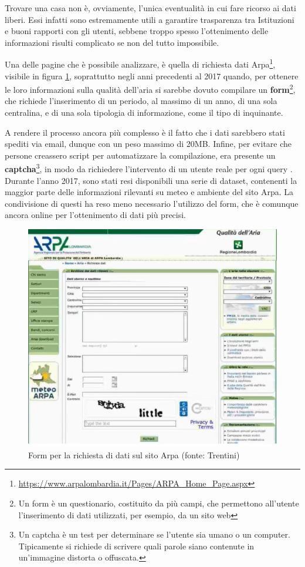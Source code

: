 \documentclass[a4paper,12pt]{report}
\newcommand{\skipline}{\vspace{0.2in}}
\begin{document}
\skipline
Trovare una casa non è, ovviamente, l'unica eventualità in cui fare ricorso ai dati liberi. 
Essi infatti sono estremamente utili a garantire trasparenza tra Istituzioni e buoni 
rapporti con gli utenti, sebbene troppo spesso l'ottenimento delle informazioni 
risulti complicato se non del tutto impossibile.

Una delle pagine che è possibile analizzare, è quella di richiesta dati 
Arpa\footnote{\url{https://www.arpalombardia.it/Pages/ARPA_Home_Page.aspx}}, 
visibile in figura \ref{fig:arpa},
soprattutto negli anni precedenti al 2017 quando, per ottenere le loro informazioni 
sulla qualità dell'aria si sarebbe dovuto compilare un 
\textbf{form}\footnote{Un form è un questionario, costituito da più campi, che 
permettono all'utente l'inserimento di dati utilizzati, per esempio, da un sito web}, 
che richiede l'inserimento di un periodo, al massimo di un anno, di una sola 
centralina, e di una sola tipologia di informazione, come il tipo di inquinante. 

A rendere il processo ancora più complesso è il fatto che i dati sarebbero stati 
spediti via email, dunque con un peso massimo di 20MB. 
Infine, per evitare che persone creassero script per automatizzare la compilazione, 
era presente un \textbf{captcha}\footnote{Un captcha è un test per determinare se l'utente 
sia umano o un computer. Tipicamente si richiede di scrivere quali parole siano 
contenute in un'immagine distorta o offuscata.}, in modo da richiedere l'intervento 
di un utente reale per ogni query \cite{TRENTINI:1}. 
Durante l'anno 2017, sono stati resi disponibili una serie di dataset, contenenti la maggior 
parte delle informazioni rilevanti su meteo e ambiente del sito Arpa. 
La condivisione di questi ha reso meno necessario l'utilizzo del form, che 
è comunque ancora online per l'ottenimento di dati più precisi. 

\begin{figure}
    \hfill\includegraphics[width=0.7\linewidth]{img/arpa.png}\hspace*{\fill}
    \caption{Form per la richiesta di dati sul sito Arpa (fonte: Trentini)}
    \label{fig:arpa}
\end{figure}
\end{document}
